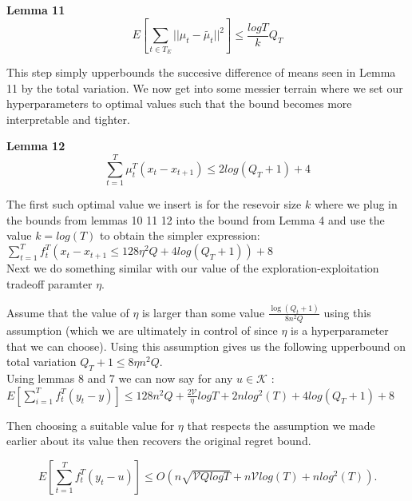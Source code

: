 \textbf{Lemma 11}
\begin{equation}
  E[\sum_{t \in T_E} ||\mu_t - \tilde{\mu_t} ||^2] \leq \frac{log T}{k} Q_T
\end{equation}

This step simply upperbounds the  succesive difference of means seen in  Lemma 11 by the total variation. 
We now get into some messier terrain where we set our hyperparameters to optimal values such that the bound becomes more interpretable and tighter.

\textbf{Lemma 12}
\begin{equation}
  \sum_{t=1}^T \mu_t^T (x_t - x_{t+1}) \leq 2 log(Q_T + 1) + 4
\end{equation}

The first such optimal value we insert is for the resevoir size $k$ where we plug in the bounds from lemmas 10 11 12 into the bound from Lemma 4 and use the value $k=log(T)$ to obtain the simpler expression:\\

$\sum_{t=1}^T f_t^T (x_t - x_{t+1} \leq 128 \eta^2Q + 4log(Q_T +1))+ 8$ \\

Next we do something similar with our value of the exploration-exploitation tradeoff paramter $\eta$. 

Assume that the value of $\eta$ is larger than some value $\frac{\log(Q_t +1)}{8 n^2 Q}$ using this assumption (which we are ultimately in control of since $\eta$ is a hyperparameter that we can choose). Using this assumption gives us the following upperbound on total variation  $Q_T + 1 \leq 8 \eta n^2 Q$. \\

Using lemmas 8 and 7 we can now say for any $u \in \mathcal{K}$  : \\

$E[ \sum_{i=1}^T f_t^T (y_t -y) ] \leq 128 n^2Q + \frac{2 \mathcal{V}}{\eta} logT 
+  2 nlog^2(T) + 4log(Q_T +1) + 8 $

Then choosing a suitable value for $\eta$ that respects the assumption we made earlier about its value then recovers the original regret bound.

\begin{equation}
  E[\sum_{t=1}^T f_t^T (y_t - u)] \leq O(n \sqrt{\mathcal{V}Qlog T} + n \mathcal{V} log(T) + nlog^2(T)) . 
\end{equation}
